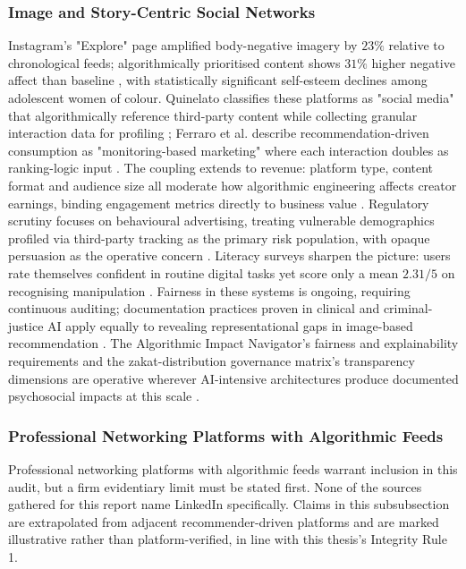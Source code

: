 \documentclass[11pt]{article}
\begin{document}
\subsubsection{Image and Story-Centric Social Networks}
\label{sec:image_story_social_networks} Instagram's "Explore" page amplified body-negative imagery by $23\%$ relative to chronological feeds; algorithmically prioritised content shows $31\%$ higher negative affect than baseline \parencites[3]{3303310}, with statistically significant self-esteem declines among adolescent women of colour. Quinelato classifies these platforms as "social media" that algorithmically reference third-party content while collecting granular interaction data for profiling \parencites[4]{6941611}; Ferraro et al. describe recommendation-driven consumption as "monitoring-based marketing" where each interaction doubles as ranking-logic input \parencites[5]{6314747}. The coupling extends to revenue: platform type, content format and audience size all moderate how algorithmic engineering affects creator earnings, binding engagement metrics directly to business value \parencites[3]{5673308}. Regulatory scrutiny focuses on behavioural advertising, treating vulnerable demographics profiled via third-party tracking as the primary risk population, with opaque persuasion as the operative concern \parencites[4]{6941611}. Literacy surveys sharpen the picture: users rate themselves confident in routine digital tasks yet score only a mean $2.31/5$ on recognising manipulation \parencites[10]{9360054}. Fairness in these systems is ongoing, requiring continuous auditing; documentation practices proven in clinical and criminal-justice AI apply equally to revealing representational gaps in image-based recommendation \parencites[20]{2616018}. The Algorithmic Impact Navigator's fairness and explainability requirements \parencites[2]{2742041} and the zakat-distribution governance matrix's transparency dimensions \parencites[4]{2702055} are operative wherever AI-intensive architectures produce documented psychosocial impacts at this scale \parencites[3]{3303310}[5]{6314747}.

\subsubsection{Professional Networking Platforms with Algorithmic Feeds}
\label{sec:prof_networking_algo_feeds} Professional networking platforms with algorithmic feeds warrant inclusion in this audit, but a firm evidentiary limit must be stated first. None of the sources gathered for this report name LinkedIn specifically. Claims in this subsubsection are extrapolated from adjacent recommender-driven platforms and are marked illustrative rather than platform-verified, in line with this thesis's Integrity Rule 1.
\end{document}
